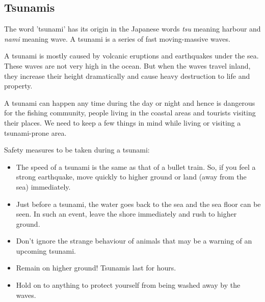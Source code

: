 \subsection{\textbf{Tsunamis}}
The word 'tsunami' has its origin in the Japanese words \textit{tsu} meaning harbour and \textit{nami} meaning wave. A tsunami is a series of fast moving-massive waves.
\vspace{0.1in}
\par
A tsunami is mostly caused by volcanic eruptions and earthquakes under the sea. These waves are not very high in the ocean. But when the waves travel inland, they increase their height dramatically and cause heavy destruction to life and property.
\vspace{0.1in}
\par
A tsunami can happen any time during the day or night and hence is dangerous for the fishing community, people living in the coastal areas and tourists visiting their places. We need to keep a few things in mind while living or visiting a tsunami-prone area.
\vspace{0.1in}
\par
Safety measures to be taken during a tsunami:
\begin{itemize}
    \item The speed of a tsunami is the same as that of a bullet train. So, if you feel a strong earthquake, move quickly to higher ground or land (away from the sea) immediately.
    \item Just before a tsunami, the water goes back to the sea and the sea floor can be seen. In such an event, leave the shore immediately and rush to higher ground.
    \vspace{0.4in}
    \item Don't ignore the strange behaviour of animals that may be a warning of an upcoming tsunami.
    \item Remain on higher ground! Tsunamis last for hours.
    \item Hold on to anything to protect yourself from being washed away by the waves.
\end{itemize}
